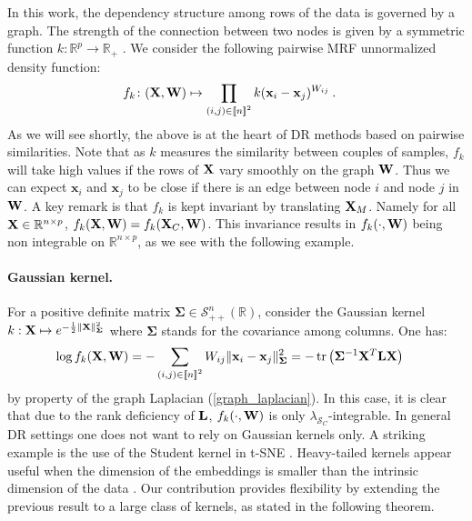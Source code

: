 In this work, the dependency structure among rows of the data is governed by a graph. The strength of the connection between two nodes is given by a symmetric function $k: \mathbb{R}^p \to \mathbb{R}_+$ . We consider the following pairwise MRF unnormalized density function:
\begin{align}\label{eq:unnormalized_MRF}
  f_{k} \colon (\mathbf{X},\mathbf{W}) &\mapsto \prod_{(i,j) \in {[\![n]\!]}^2} k(\mathbf{x}_{i} - \mathbf{x}_{j})^{W_{ij}} \: .
\end{align}
As we will see shortly, the above is at the heart of DR methods based on pairwise similarities. Note that as $k$ measures the similarity between couples of samples, $f_k$ will take high values if the rows of $\mathbf{X}$ vary smoothly on the graph $\mathbf{W}$. Thus we can expect $\mathbf{x}_i$ and $\mathbf{x}_j$ to be close if there is an edge between node $i$ and node $j$ in $\mathbf{W}$. A key remark is that $f_{k}$ is kept invariant by translating $\mathbf{X}_{M}$. Namely for all $\mathbf{X} \in \mathbb{R}^{n \times p}$, $f_{k}(\mathbf{X}, \mathbf{W}) = f_{k}(\mathbf{X}_{C}, \mathbf{W})$. This invariance results in $f_{k}(\cdot, \mathbf{W})$ being non integrable on $\mathbb{R}^{n \times p}$, as we see with the following example. 

\paragraph{Gaussian kernel.} For a positive definite matrix $\mathbf{\Sigma} \in \mathcal{S}^n_{++}(\mathbb{R})$, consider the Gaussian kernel $k : \mathbf{X} \mapsto e^{- \frac{1}{2}\| \mathbf{X} \|_{\mathbf{\Sigma}}^2}$ where $\mathbf{\Sigma}$ stands for the covariance among columns. One has:
\begin{align}\label{eq:gaussian_kernel}
    \log f_{k}(\mathbf{X}, \mathbf{W}) &= -\sum_{(i,j) \in {[\![n]\!]}^2} W_{ij} \| \mathbf{x}_{i}-\mathbf{x}_{j} \|^2_{\mathbf{\Sigma}}
    = - \operatorname{tr} \left(\mathbf{\Sigma}^{-1} \mathbf{X}^{T} \mathbf{L} \mathbf{X}\right)
\end{align}
by property of the graph Laplacian (\cref{graph_laplacian}). In this case, it is clear that due to the rank deficiency of $\mathbf{L}$, $f_{k}(\cdot, \mathbf{W})$ is only $\lambda_{\mathcal{S}_{C}}$-integrable. In general DR settings one does not want to rely on Gaussian kernels only. A striking example is the use of the Student kernel in t-SNE \citep{maaten2008tSNE}. Heavy-tailed kernels appear useful when the dimension of the embeddings is smaller than the intrinsic dimension of the data \citep{kobak2019heavy}. Our contribution provides flexibility by extending the previous result to a large class of kernels, as stated in the following theorem.

